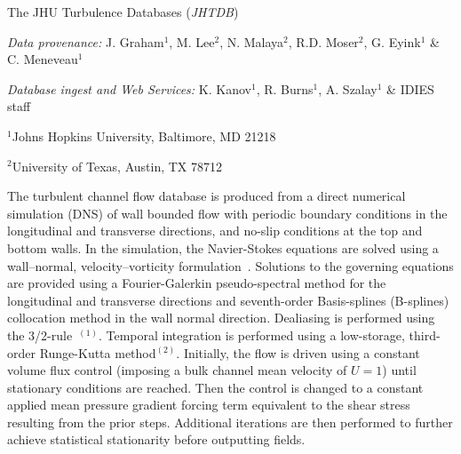 \documentclass[11pt,letterpaper]{article}
\begin{document}
\begin{center}
{\LARGE {\color{jhublue} The JHU Turbulence Databases ({\it JHTDB})}} 

\vspace{0.7 cm}

\vspace{0.4 cm}

  {\it Data provenance:} J. Graham$^1$, M. Lee$^2$, N. Malaya$^2$,  R.D. Moser$^2$, G. Eyink$^1$ \& C. Meneveau$^1$
\vspace{0.1 cm}

 {\it Database ingest and Web Services:} K. Kanov$^1$, R. Burns$^1$, A. Szalay$^1$ \& IDIES staff
 \vspace{0.1 cm}
 
  $^1$Johns Hopkins University, Baltimore, MD 21218
  \vspace{0.1 cm}
  
   $^2$University of Texas, Austin, TX 78712
\end{center}
\vspace{2pt}


The turbulent channel flow database is produced from a direct numerical simulation (DNS) of wall bounded flow with periodic boundary conditions in the longitudinal and transverse directions, and no-slip conditions at the top and bottom walls.  In the simulation, the Navier-Stokes equations are solved using a wall--normal, velocity--vorticity formulation~\cite{Kim1987}. Solutions to the governing equations are provided using a Fourier-Galerkin pseudo-spectral method for the longitudinal and transverse directions and seventh-order Basis-splines (B-splines) collocation method in the wall normal direction. Dealiasing is performed using the 3/2-rule~\cite{Orszag1971}$^{(1)}$. Temporal integration is performed using a low-storage, third-order Runge-Kutta method$^{(2)}$. Initially, the flow is driven using a constant volume flux control (imposing a bulk channel mean velocity of $U=1$) until stationary conditions are reached. Then the control is changed to a constant applied mean pressure gradient forcing term equivalent to the shear stress resulting from the prior steps. Additional iterations are then performed to further achieve statistical stationarity before outputting fields. 
\end{document}
